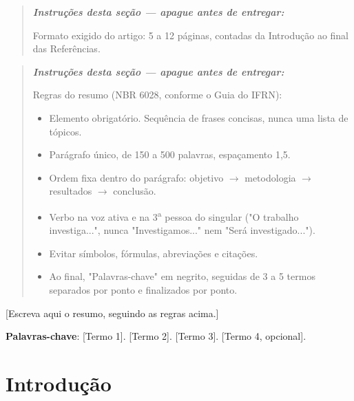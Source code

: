 \documentclass[article,12pt,a4paper]{abntex2}
\newenvironment{instrucoes}{%
  \begin{quotation}\footnotesize\itshape
  \noindent\textbf{\upshape Instruções desta seção — apague antes de entregar:}\par\smallskip
}{%
  \end{quotation}
}
\begin{document}
\maketitle
\thispagestyle{fancy}

\begin{instrucoes}
Formato exigido do artigo: 5 a 12 páginas, contadas da Introdução ao final
das Referências.
\end{instrucoes}

\begin{resumo}
\begin{instrucoes}
Regras do resumo (NBR 6028, conforme o Guia do IFRN):
\begin{itemize}
  \item Elemento obrigatório. Sequência de frases concisas, nunca uma lista de tópicos.
  \item Parágrafo único, de 150 a 500 palavras, espaçamento 1,5.
  \item Ordem fixa dentro do parágrafo: objetivo $\to$ metodologia $\to$ resultados $\to$ conclusão.
  \item Verbo na voz ativa e na 3\textsuperscript{a} pessoa do singular ("O trabalho investiga...", nunca "Investigamos..." nem "Será investigado...").
  \item Evitar símbolos, fórmulas, abreviações e citações.
  \item Ao final, "Palavras-chave" em negrito, seguidas de 3 a 5 termos separados por ponto e finalizados por ponto.
\end{itemize}
\end{instrucoes}

[Escreva aqui o resumo, seguindo as regras acima.]

\vspace{\onelineskip}
\noindent
\textbf{Palavras-chave}: [Termo 1]. [Termo 2]. [Termo 3]. [Termo 4, opcional].
\end{resumo}

\textual
\pagestyle{fancy}

\section{Introdução}
\end{document}

